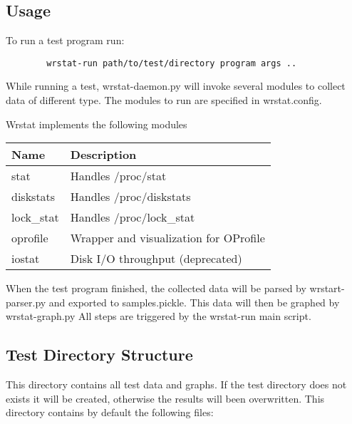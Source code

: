 \subsection{Usage}
	To run a test program run:

    \begin{lstlisting}
        wrstat-run path/to/test/directory program args ..
    \end{lstlisting}

	While running a test, wrstat-daemon.py will invoke several
	modules to collect data of different type. The modules to run are
	specified in wrstat.config.

    Wrstat implements the following modules\\

    \begin{tabular}{l|l}
        Name & Description \\
        \hline
        stat		&Handles /proc/stat\\
        diskstats	&Handles /proc/diskstats\\
        lock\_stat	&Handles /proc/lock\_stat\\
        oprofile	&Wrapper and visualization for OProfile\\
        iostat		&Disk I/O throughput (deprecated)\\
    \end{tabular}

    When the test program finished, the collected data will be parsed
	by wrstart-parser.py and exported to samples.pickle.
    This data will then be graphed by wrstat-graph.py
    All steps are triggered by the wrstat-run main script.

\subsection{Test Directory Structure}
    This directory contains all test data and graphs.
    If the test directory does not exists it will be created,
    otherwise the results will been overwritten.
    This directory contains by default the following files:

